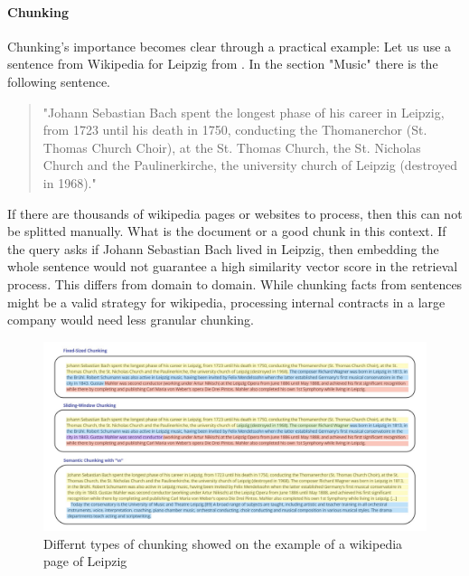 \paragraph{Chunking}
\label{sec:chunk}
Chunking's importance becomes clear through a practical example: Let us use a sentence from Wikipedia \cite{LeipzigWikipedia.2025} for Leipzig from \citeyear{LeipzigWikipedia.2025}. In the section "Music" there is the following sentence.

\begin{quote}
    "Johann Sebastian Bach spent the longest phase of his career in Leipzig, from 1723 until his death in 1750, conducting the Thomanerchor (St. Thomas Church Choir), at the St. Thomas Church, the St. Nicholas Church and the Paulinerkirche, the university church of Leipzig (destroyed in 1968)."
\end{quote}

If there are thousands of wikipedia pages or websites to process, then this can not be splitted manually. What is the document or a good chunk in this context. If the query asks if Johann Sebastian Bach lived in Leipzig, then embedding the whole sentence would not guarantee a high similarity vector score in the retrieval process. This differs from domain to domain. While chunking facts from sentences might be a valid strategy for wikipedia, processing internal contracts in a large company would need less granular chunking.

\begin{figure}
    \centering
    \includegraphics[width=\textwidth]{images/Chunking.pdf}
    \caption{Differnt types of chunking showed on the example of a wikipedia page of Leipzig\cite{LeipzigWikipedia.2025}}
    \label{fig:chunking}
\end{figure}

